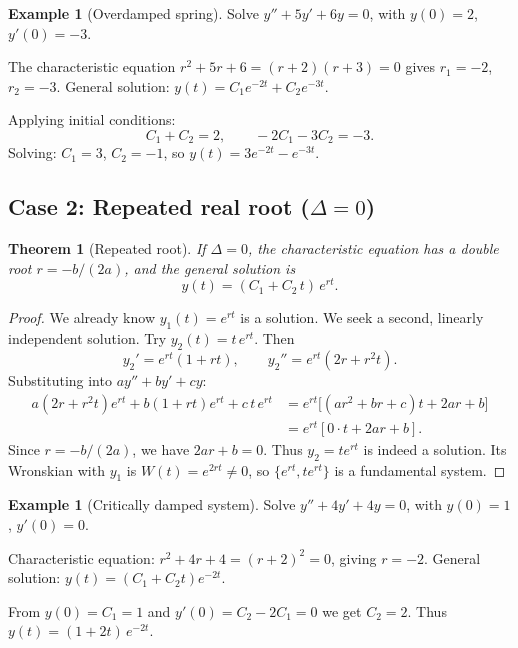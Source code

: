 \documentclass[12pt,a4paper,openany]{book}
\theoremstyle{definition}
\newtheorem{example}[definition]{Example}
\theoremstyle{plain}
\newtheorem{theorem}[definition]{Theorem}
\theoremstyle{remark}
\begin{document}
\begin{example}[Overdamped spring]\label{ex:overdamped}
Solve $y'' + 5y' + 6y = 0$, with $y(0) = 2$, $y'(0) = -3$.

The characteristic equation $r^2 + 5r + 6 = (r+2)(r+3) = 0$ gives
$r_1 = -2$, $r_2 = -3$. General solution:
$y(t) = C_1 e^{-2t} + C_2 e^{-3t}$.

Applying initial conditions:
\[
  C_1 + C_2 = 2, \qquad -2C_1 - 3C_2 = -3.
\]
Solving: $C_1 = 3$, $C_2 = -1$, so $y(t) = 3e^{-2t} - e^{-3t}$.
\end{example}

\subsection{Case 2: Repeated real root ($\Delta = 0$)}\label{subsec:case2}

\begin{theorem}[Repeated root]\label{thm:repeated-root}
If $\Delta = 0$, the characteristic equation has a double root
$r = -b/(2a)$, and the general solution is
\begin{equation}\label{eq:gen-sol-case2}
  y(t) = (C_1 + C_2\,t)\,e^{rt}.
\end{equation}
\end{theorem}

\begin{proof}
We already know $y_1(t) = e^{rt}$ is a solution. We seek a second,
linearly independent solution. Try $y_2(t) = t\,e^{rt}$. Then
\[
  y_2' = e^{rt}(1 + rt), \qquad
  y_2'' = e^{rt}(2r + r^2 t).
\]
Substituting into $ay'' + by' + cy$:
\begin{align*}
  a(2r + r^2 t)e^{rt} + b(1+rt)e^{rt} + c\,t\,e^{rt}
  &= e^{rt}\bigl[(ar^2+br+c)t + 2ar + b\bigr] \\
  &= e^{rt}[0 \cdot t + 2ar + b].
\end{align*}
Since $r = -b/(2a)$, we have $2ar + b = 0$. Thus $y_2 = te^{rt}$ is indeed
a solution. Its Wronskian with $y_1$ is
$W(t) = e^{2rt} \ne 0$,
so $\{e^{rt}, te^{rt}\}$ is a fundamental system.
\end{proof}

\begin{example}[Critically damped system]\label{ex:critically-damped}
Solve $y'' + 4y' + 4y = 0$, with $y(0) = 1$, $y'(0) = 0$.

Characteristic equation: $r^2 + 4r + 4 = (r+2)^2 = 0$, giving $r = -2$.
General solution: $y(t) = (C_1 + C_2 t)e^{-2t}$.

From $y(0) = C_1 = 1$ and $y'(0) = C_2 - 2C_1 = 0$ we get $C_2 = 2$.
Thus $y(t) = (1 + 2t)\,e^{-2t}$.
\end{example}
\end{document}
